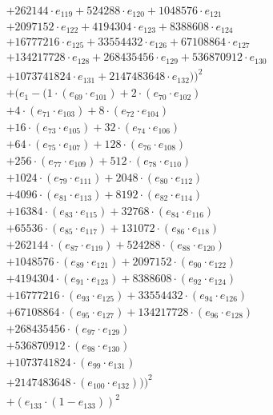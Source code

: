 \documentclass[10pt, a4paper]{article}
\begin{document}
\begin{small}
\begin{align*}
& + 262144 \cdot e_{119} + 524288 \cdot e_{120} + 1048576 \cdot e_{121} \\
& + 2097152 \cdot e_{122} + 4194304 \cdot e_{123} + 8388608 \cdot e_{124} \\
& + 16777216 \cdot e_{125} + 33554432 \cdot e_{126} + 67108864 \cdot e_{127} \\
& + 134217728 \cdot e_{128} + 268435456 \cdot e_{129} + 536870912 \cdot e_{130} \\
& + 1073741824 \cdot e_{131} + 2147483648 \cdot e_{132}))^{2} \\
& + (e_{1} - (1 \cdot (e_{69} \cdot e_{101}) + 2 \cdot (e_{70} \cdot e_{102}) \\
& + 4 \cdot (e_{71} \cdot e_{103}) + 8 \cdot (e_{72} \cdot e_{104}) \\
& + 16 \cdot (e_{73} \cdot e_{105}) + 32 \cdot (e_{74} \cdot e_{106}) \\
& + 64 \cdot (e_{75} \cdot e_{107}) + 128 \cdot (e_{76} \cdot e_{108}) \\
& + 256 \cdot (e_{77} \cdot e_{109}) + 512 \cdot (e_{78} \cdot e_{110}) \\
& + 1024 \cdot (e_{79} \cdot e_{111}) + 2048 \cdot (e_{80} \cdot e_{112}) \\
& + 4096 \cdot (e_{81} \cdot e_{113}) + 8192 \cdot (e_{82} \cdot e_{114}) \\
& + 16384 \cdot (e_{83} \cdot e_{115}) + 32768 \cdot (e_{84} \cdot e_{116}) \\
& + 65536 \cdot (e_{85} \cdot e_{117}) + 131072 \cdot (e_{86} \cdot e_{118}) \\
& + 262144 \cdot (e_{87} \cdot e_{119}) + 524288 \cdot (e_{88} \cdot e_{120}) \\
& + 1048576 \cdot (e_{89} \cdot e_{121}) + 2097152 \cdot (e_{90} \cdot e_{122}) \\
& + 4194304 \cdot (e_{91} \cdot e_{123}) + 8388608 \cdot (e_{92} \cdot e_{124}) \\
& + 16777216 \cdot (e_{93} \cdot e_{125}) + 33554432 \cdot (e_{94} \cdot e_{126}) \\
& + 67108864 \cdot (e_{95} \cdot e_{127}) + 134217728 \cdot (e_{96} \cdot e_{128}) \\
& + 268435456 \cdot (e_{97} \cdot e_{129}) \\
& + 536870912 \cdot (e_{98} \cdot e_{130}) \\
& + 1073741824 \cdot (e_{99} \cdot e_{131}) \\
& + 2147483648 \cdot (e_{100} \cdot e_{132})))^{2} \\
& + (e_{133} \cdot (1 - e_{133}))^{2} \\

\end{align*}
\end{small}
\end{document}
